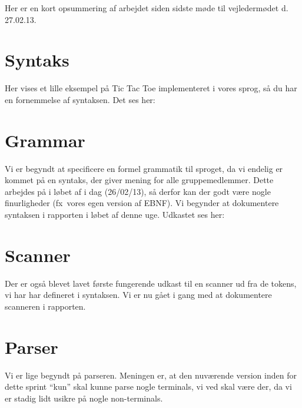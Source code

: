 

\date{Tirsdag 26 februar, 2013}


\maketitle

Her er en kort opsummering af arbejdet siden sidste møde til vejledermødet d. 27.02.13.

\section{Syntaks}
Her vises et lille eksempel på Tic Tac Toe implementeret i vores sprog, så du har en fornemmelse af syntaksen. Det ses her:


\section{Grammar}
Vi er begyndt at specificere en formel grammatik til sproget, da vi endelig er kommet på en syntaks, der giver mening for alle gruppemedlemmer. Dette arbejdes på i løbet af i dag (26/02/13), så derfor kan der godt være nogle finurligheder (fx\ vores egen version af EBNF). Vi begynder at dokumentere syntaksen i rapporten i løbet af denne uge. Udkastet ses her:



\section{Scanner}
Der er også blevet lavet første fungerende udkast til en scanner ud fra de tokens, vi har har defineret i syntaksen. Vi er nu gået i gang med at dokumentere scanneren i rapporten.

\section{Parser}
Vi er lige begyndt på parseren. Meningen er, at den nuværende version inden for dette sprint ``kun'' skal kunne parse nogle terminals, vi ved skal være der, da vi er stadig lidt usikre på nogle non-terminals.


